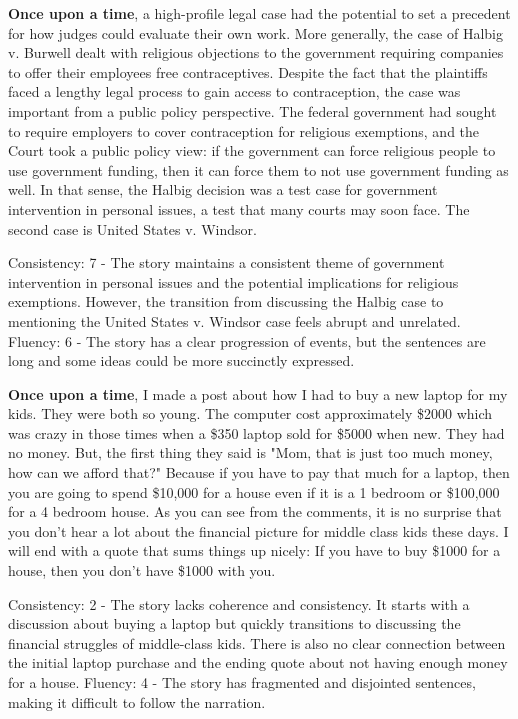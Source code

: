 \documentclass{article}
\begin{document}
\textbf{Once upon a time}, a high-profile legal case had the potential to set a precedent for how judges could evaluate their own work. More generally, the case of Halbig v. Burwell dealt with religious objections to the government requiring companies to offer their employees free contraceptives. Despite the fact that the plaintiffs faced a lengthy legal process to gain access to contraception, the case was important from a public policy perspective. The federal government had sought to require employers to cover contraception for religious exemptions, and the Court took a public policy view: if the government can force religious people to use government funding, then it can force them to not use government funding as well. In that sense, the Halbig decision was a test case for government intervention in personal issues, a test that many courts may soon face. The second case is United States v. Windsor.

Consistency: 7 - The story maintains a consistent theme of government intervention in personal issues and the potential implications for religious exemptions. However, the transition from discussing the Halbig case to mentioning the United States v. Windsor case feels abrupt and unrelated.
Fluency: 6 - The story has a clear progression of events, but the sentences are long and some ideas could be more succinctly expressed.

\textbf{Once upon a time}, I made a post about how I had to buy a new laptop for my kids. They were both so young. The computer cost approximately \$2000 which was crazy in those times when a \$350 laptop sold for \$5000 when new. They had no money. But, the first thing they said is "Mom, that is just too much money, how can we afford that?" Because if you have to pay that much for a laptop, then you are going to spend \$10,000 for a house even if it is a 1 bedroom or \$100,000 for a 4 bedroom house. As you can see from the comments, it is no surprise that you don't hear a lot about the financial picture for middle class kids these days. I will end with a quote that sums things up nicely: If you have to buy \$1000 for a house, then you don't have \$1000 with you.

Consistency: 2 - The story lacks coherence and consistency. It starts with a discussion about buying a laptop but quickly transitions to discussing the financial struggles of middle-class kids. There is also no clear connection between the initial laptop purchase and the ending quote about not having enough money for a house.
Fluency: 4 - The story has fragmented and disjointed sentences, making it difficult to follow the narration.
\end{document}
